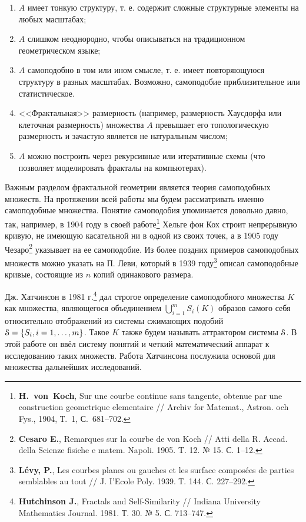 \documentclass[a5paper,9pt,twoside]{extarticle} %
\begin{document}
\begin{enumerate}
\item $A$ имеет тонкую структуру, т. е. содержит сложные структурные элементы на любых масштабах;
\item $A$ слишком неоднородно, чтобы описываться на традиционном геометрическом языке;
\item $A$ самоподобно в том или ином смысле, т. е. имеет повторяющуюся структуру в разных масштабах. Возможно, самоподобие приблизительное или статистическое.
\item <<Фрактальная>> размерность (например, размерность Хаусдорфа или клеточная размерность) множества $A$  превышает его топологическую размерность и зачастую является не натуральным числом;
\item $A$ можно построить через рекурсивные или итеративные схемы (что позволяет моделировать фракталы на компьютерах).
\end{enumerate}


Важным разделом фрактальной геометрии является теория самоподобных множеств.
На протяжении всей работы мы будем рассматривать именно самоподобные множества.
Понятие самоподобия упоминается довольно давно, так, например, в 1904 году в своей работе\footnote{{\bf H.~von~Koch}, Sur une courbe continue sans tangente, obtenue par
une construction geometrique elementaire // Archiv for Matemat., Astron. och Fys., 1904, Т.~1, С.~681--702.} Хельге фон Кох строит  непрерывную кривую, не имеющую касательной ни в одной из своих точек, а в 1905 году Чезаро\footnote{{\bf Cesaro E.}, Remarques sur la courbe de von Koch // Atti della R. Accad. della Scienze fisiche e matem. Napoli. 1905. T. 12. № 15. С. 1--12.} указывает на ее самоподобие.
Из более поздних примеров самоподобных множеств можно указать на П. Леви, который в 1939 году\footnote{{\bf L{\'e}vy, P.}, Les courbes planes ou gauches et les surface compos{\'e}es de parties semblables au tout // J. I’Ecole Poly. 1939. Т. 144. С. 227--292.} описал самоподобные кривые, состоящие из $n$ копий одинакового размера.

Дж. Хатчинсон в 1981 г.\footnote{{\bf Hutchinson J.}, Fractals and Self-Similarity // Indiana University Mathematics Journal. 1981. Т. 30. № 5. С. 713--747.} дал строгое определение самоподобного множества $K$ как множества, являющегося объединением $\bigcup_{i=1}^mS_i(K)$ образов самого себя относительно отображений из системы сжимающих подобий ${\EuScript S}=\{S_i, i=1,\ldots,m\}$. 
Такое $K$ также будем называть аттрактором системы ${\EuScript S}$.
В этой работе он ввёл систему понятий и четкий математический аппарат к исследованию таких множеств. 
Работа Хатчинсона послужила основой для множества дальнейших исследований.
\end{document}
